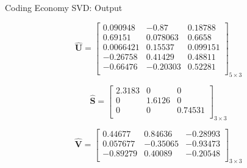 \documentclass[9pt]{beamer}
\begin{document}
\begin{frame}{Coding Economy SVD: Output}
    
    \begin{displaymath}
    \mathbf{\hat{U}} = 
        \begin{bmatrix}
            0.090948&	-0.87&	0.18788\\
            0.69151	&0.078063&	0.6658\\
            0.0066421&	0.15537	&0.099151\\
            -0.26758&	0.41429	&0.48811\\
            -0.66476&	-0.20303&	0.52281\\
        \end{bmatrix}_{5 \times 3}
    \end{displaymath}
    
        \begin{displaymath}
    \mathbf{\hat{S}} = 
        \begin{bmatrix}
            2.3183&	0&	0\\
            0&	1.6126&	0\\
            0&	0&	0.74531\\
        \end{bmatrix}_{3 \times 3}
    \end{displaymath}
    
    \begin{displaymath}
    \mathbf{\hat{V}} = 
        \begin{bmatrix}
            0.44677	&0.84636&	-0.28993\\
            0.057677&	-0.35065&	-0.93473\\
            -0.89279&	0.40089&	-0.20548\\
        \end{bmatrix}_{3 \times 3}
    \end{displaymath}

    
\end{frame}

\end{document}
